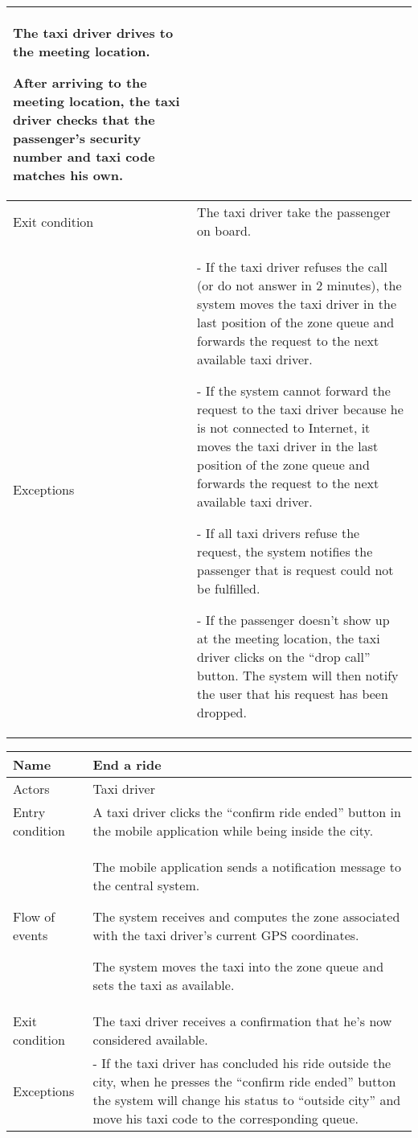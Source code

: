 \begin{center}
\begin{longtable}{|l| p{9cm}|}
The taxi driver drives to the meeting location.

After arriving to the meeting location, the taxi driver checks that the passenger's security number and taxi code matches his own. \\
\hline
Exit condition &
The taxi driver take the passenger on board. \\
\hline
Exceptions &
- If the taxi driver refuses the call (or do not answer in 2 minutes), the system moves the taxi driver in the last position of the zone queue and forwards the request to the next available taxi driver.

- If the system cannot forward the request to the taxi driver because he is not connected to Internet, it moves the taxi driver in the last position of the zone queue and forwards the request to the next available taxi driver.

- If all taxi drivers refuse the request, the system notifies the passenger that is request could not be fulfilled.

- If the passenger doesn't show up at the meeting location, the taxi driver clicks on the “drop call” button. The system will then notify the user that his request has been dropped. \\
\hline
\end{longtable}

\begin{longtable}{|l| p{9cm}|}
\hline
Name &
End a ride \\
\hline
Actors &
Taxi driver \\
\hline
Entry condition & 
A taxi driver clicks the “confirm ride ended” button in the mobile application while being inside the city. \\
\hline
Flow of events & 
The mobile application sends a notification message to the central system.

The system receives and computes the zone associated with the taxi driver's current GPS coordinates.

The system moves the taxi into the zone queue and sets the taxi as available. \\
\hline
Exit condition &
The taxi driver receives a confirmation that he's now considered available. \\
\hline
Exceptions &
- If the taxi driver has concluded his ride outside the city, when he presses the “confirm ride ended” button the system will change his status to “outside city” and move his taxi code to the corresponding queue.\\
\hline
\end{longtable}


\end{center}
